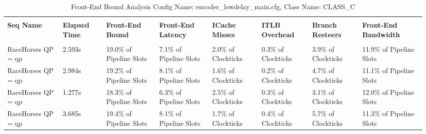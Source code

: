 \documentclass{article}%
\begin{document}
\begin{longtabu}{| X[l] | X[l] | X[l] | X[l] | X[l] | X[l] | X[l] | X[l] |}%
\caption{%
Front{-}End Bound Analysis\newline%
 Config Name: encoder\_lowdelay\_main.cfg,\newline%
 Class Name: CLASS\_C\newline%
%
}%
\hline%
&&&&&&&\\%
\textbf{Seq Name}&\textbf{Elapsed Time}&\textbf{Front{-}End Bound}&\textbf{Front{-}End Latency}&\textbf{ICache Misses}&\textbf{ITLB Overhead}&\textbf{Branch Resteers}&\textbf{Front{-}End Bandwidth}\\%
&&&&&&&\\%
\hline%
\endhead%
RaceHorses\newline%
 QP = qp&2.593s&19.0\% of Pipeline Slots&7.1\% of Pipeline Slots&2.0\% of Clockticks&0.3\% of Clockticks&3.9\% of Clockticks&11.9\% of Pipeline Slots\\%
\hline%
RaceHorses\newline%
 QP = qp&2.984s&19.2\% of Pipeline Slots&8.1\% of Pipeline Slots&1.6\% of Clockticks&0.2\% of Clockticks&4.7\% of Clockticks&11.1\% of Pipeline Slots\\%
\hline%
RaceHorses\newline%
 QP = qp&1.277s&18.3\% of Pipeline Slots&6.3\% of Pipeline Slots&2.5\% of Clockticks&0.3\% of Clockticks&3.1\% of Clockticks&12.0\% of Pipeline Slots\\%
\hline%
RaceHorses\newline%
 QP = qp&3.685s&19.4\% of Pipeline Slots&8.1\% of Pipeline Slots&1.7\% of Clockticks&0.4\% of Clockticks&5.7\% of Clockticks&11.3\% of Pipeline Slots\\%
\hline%
\end{longtabu}%
\newpage%
\end{document}
